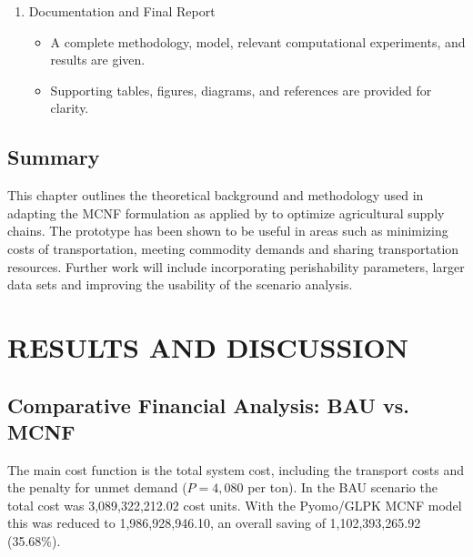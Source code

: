 \documentclass{icsthesis}
\begin{document}
\begin{mainmatter}
\begin{enumerate}
    \item {Documentation and Final Report}
    \begin{itemize}
        \item A complete methodology, model, relevant computational experiments, and results are given.
        \item Supporting tables, figures, diagrams, and references are provided for clarity.
    \end{itemize}
\end{enumerate}



\subsection{Summary}
This chapter outlines the theoretical background and methodology used in adapting the MCNF formulation as applied by \citet{rodrigo2018} to optimize agricultural supply chains. The prototype has been shown to be useful in areas such as minimizing costs of transportation, meeting commodity demands and sharing transportation resources. Further work will include incorporating perishability parameters, larger data sets and improving the usability of the scenario analysis.


\section{RESULTS AND DISCUSSION}

\subsection{Comparative Financial Analysis: BAU vs. MCNF}
The main cost function is the total system cost, including the transport costs and the penalty for unmet demand ($P = 4{,}080$ per ton). In the BAU scenario the total cost was 3,089,322,212.02 cost units. With the Pyomo/GLPK MCNF model this was reduced to 1,986,928,946.10, an overall saving of 1,102,393,265.92 (35.68\%).


\end{mainmatter}
\end{document}
